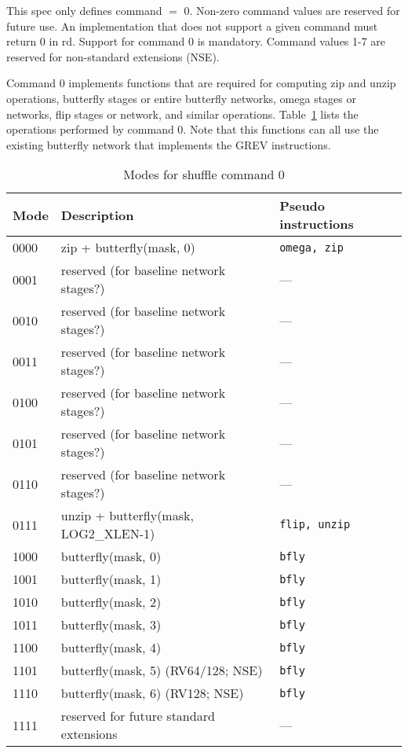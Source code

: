 This spec only defines command $=$ 0. Non-zero command values are reserved for
future use.  An implementation that does not support a given command must
return 0 in rd. Support for command 0 is mandatory. Command values 1-7 are
reserved for non-standard extensions (NSE).

Command 0 implements functions that are required for computing zip and unzip
operations, butterfly stages or entire butterfly networks, omega stages or networks, flip
stages or network, and similar operations. Table~\ref{shuffle-modes} lists the
operations performed by command 0. Note that this functions can all use the
existing butterfly network that implements the GREV instructions.

\begin{table}[h]
\begin{small}
\begin{center}
\begin{tabular}{l l l}
Mode & Description & Pseudo instructions \\ \hline

0000 & zip + butterfly(mask, 0)                  & {\tt omega, zip} \\
0001 & reserved (for baseline network stages?)   & --- \\
0010 & reserved (for baseline network stages?)   & --- \\
0011 & reserved (for baseline network stages?)   & --- \\
0100 & reserved (for baseline network stages?)   & --- \\
0101 & reserved (for baseline network stages?)   & --- \\
0110 & reserved (for baseline network stages?)   & --- \\
0111 & unzip + butterfly(mask, LOG2\_XLEN-1)     & {\tt flip, unzip} \\

\hline

1000 & butterfly(mask, 0)                        & {\tt bfly} \\
1001 & butterfly(mask, 1)                        & {\tt bfly} \\
1010 & butterfly(mask, 2)                        & {\tt bfly} \\
1011 & butterfly(mask, 3)                        & {\tt bfly} \\
1100 & butterfly(mask, 4)                        & {\tt bfly} \\
1101 & butterfly(mask, 5) (RV64/128; NSE)        & {\tt bfly} \\
1110 & butterfly(mask, 6) (RV128; NSE)           & {\tt bfly} \\
1111 & reserved for future standard extensions   & --- \\

\end{tabular}
\end{center}
\end{small}
\caption{Modes for shuffle command 0}
\label{shuffle-modes}
\end{table}

